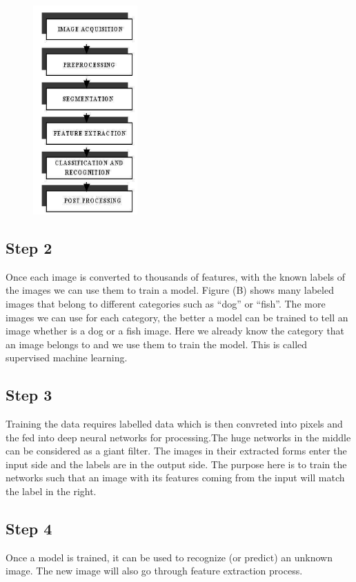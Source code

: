 \documentclass[12pt,letterpaper, onecolumn]{exam}
\begin{document}
        \begin{figure}[htp]
            \centering
            \includegraphics[width=4cm]{image_1}
            \label{fig:steps}
        \end{figure}

    \subsection{Step 2}
        Once each image is converted to thousands of features, with the known labels of the images we can use them to train a model. Figure (B) shows many labeled images that belong to different categories such as “dog” or “fish”. The more images we can use for each category, the better a model can be trained to tell an image whether is a dog or a fish image. Here we already know the category that an image belongs to and we use them to train the model. This is called supervised machine learning.
    \subsection{Step 3}
        Training the data requires labelled data which is then convreted into pixels and the fed into deep neural networks for processing.The huge networks in the middle can be considered as a giant filter. The images in their extracted forms enter the input side and the labels are in the output side. The purpose here is to train the networks such that an image with its features coming from the input will match the label in the right.
    
    \subsection{Step 4}
    Once a model is trained, it can be used to recognize (or predict) an unknown image.
    The new image will also go through feature extraction process.
    
\end{document}
